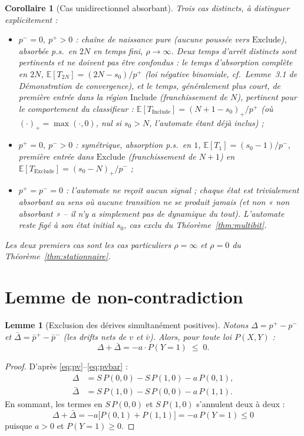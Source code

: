 \documentclass[12pt,a4paper]{article}
\newtheorem{lemma}[theorem]{Lemme}
\newtheorem{corollary}[theorem]{Corollaire}
\theoremstyle{remark}
\newcommand{\Inc}{\ensuremath{\mathrm{Include}}}
\newcommand{\Exc}{\ensuremath{\mathrm{Exclude}}}
\newcommand{\vbar}{\bar{v}}
\begin{document}
\begin{corollary}[Cas unidirectionnel absorbant]\label{cor:unidirectionnel}
Trois cas distincts, à distinguer explicitement :
\begin{itemize}
  \item $p^-=0,\ p^+>0$ : chaîne de naissance pure (aucune poussée vers
  $\Exc$), absorbée p.s.\ en $2N$ en temps fini, $\rho\to\infty$. Deux temps
  d'arrêt distincts sont pertinents et \emph{ne doivent pas être confondus} :
  le temps d'\emph{absorption complète} en $2N$,
  $\mathbb E[T_{2N}]=(2N-s_0)/p^+$ (loi négative binomiale, cf.\ Lemme~3.1 de
  \textit{Démonstration de convergence}), et le temps, généralement plus
  court, de \emph{première entrée dans la région $\Inc$}
  (franchissement de $N$), pertinent pour le comportement du classifieur :
  $\mathbb E[T_{\Inc}]=(N+1-s_0)_+/p^+$ (où $(\cdot)_+=\max(\cdot,0)$, nul si
  $s_0>N$, l'automate étant déjà inclus) ;
  \item $p^+=0,\ p^->0$ : symétrique, absorption p.s.\ en $1$,
  $\mathbb E[T_1]=(s_0-1)/p^-$, première entrée dans $\Exc$ (franchissement de
  $N{+}1$) en $\mathbb E[T_{\Exc}]=(s_0-N)_+/p^-$ ;
  \item $p^+=p^-=0$ : l'automate ne reçoit \emph{aucun} signal ; chaque état
  est trivialement absorbant au sens où aucune transition ne se produit
  jamais (et non « non absorbant » -- il n'y a simplement pas de dynamique du
  tout). L'automate reste figé à son état initial $s_0$, cas exclu du
  Théorème~\ref{thm:multibit}.
\end{itemize}
Les deux premiers cas sont les cas particuliers $\rho=\infty$ et $\rho=0$ du
Théorème~\ref{thm:stationnaire}.
\end{corollary}

\section{Lemme de non-contradiction}

\begin{lemma}[Exclusion des dérives simultanément positives]\label{lem:noncontradiction}
Notons $\Delta = p^+-p^-$ et $\bar\Delta=\bar p^+-\bar p^-$ (les drifts nets de
$v$ et $\vbar$). Alors, pour toute loi $P(X,Y)$ :
\[
  \boxed{\Delta+\bar\Delta = -a\cdot P(Y{=}1) \;\le\; 0.}
\]
\end{lemma}

\begin{proof}
D'après \eqref{eq:pv}--\eqref{eq:pvbar} :
\begin{align*}
  \Delta &= S\,P(0,0) - S\,P(1,0) - a\,P(0,1), \\
  \bar\Delta &= S\,P(1,0) - S\,P(0,0) - a\,P(1,1).
\end{align*}
En sommant, les termes en $S\,P(0,0)$ et $S\,P(1,0)$ s'annulent deux à deux :
\[
  \Delta+\bar\Delta = -a\bigl[P(0,1)+P(1,1)\bigr] = -a\,P(Y{=}1) \le 0
\]
puisque $a>0$ et $P(Y{=}1)\ge0$.
\end{proof}
\end{document}
